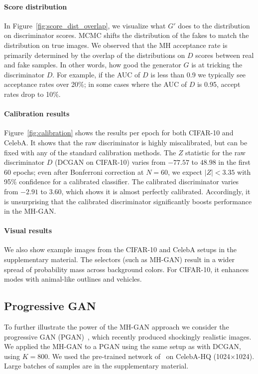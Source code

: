 \documentclass{article}
\begin{document}
\paragraph{Score distribution}
In Figure~\ref{fig:score_dist_overlap}, we visualize what $G'$ does to the distribution on discriminator scores.
MCMC shifts the distribution of the fakes to match the distribution on true images.
We observed that the MH acceptance rate is primarily determined by the overlap of the distributions on $D$ scores between real and fake samples.
In other words, how good the generator $G$ is at tricking the discriminator $D$.
For example, if the AUC of $D$ is less than 0.9 we typically see acceptance rates over 20\%; in some cases where the AUC of $D$ is 0.95, accept rates drop to 10\%.

\paragraph{Calibration results}
Figure~\ref{fig:calibration} shows the results per epoch for both CIFAR-10 and CelebA\@.
It shows that the raw discriminator is highly miscalibrated, but can be fixed with any of the standard calibration methods.
The $Z$ statistic for the raw discriminator $D$ (DCGAN on CIFAR-10) varies from $-77.57$ to $48.98$ in the first 60 epochs; even after Bonferroni correction at $N \!\!=\!\! 60$, we expect $|Z| < 3.35$ with 95\% confidence for a calibrated classifier.
The calibrated discriminator varies from $-2.91$ to $3.60$, which shows it is almost perfectly calibrated.
Accordingly, it is unsurprising that the calibrated discriminator significantly boosts performance in the MH-GAN\@.

\paragraph{Visual results}
We also show example images from the CIFAR-10 and CelebA setups in the supplementary material.
The selectors (such as MH-GAN) result in a wider spread of probability mass across background colors.
For CIFAR-10, it enhances modes with animal-like outlines and vehicles.

\subsection{Progressive GAN}

To further illustrate the power of the MH-GAN approach we consider the progressive GAN (PGAN)~\citep{Karras2017}, which recently produced shockingly realistic images.
We applied the MH-GAN to a PGAN using the same setup as with DCGAN, using $K=800$.
We used the pre-trained network of~\citet{Karras2017} on CelebA-HQ (1024$\times$1024)\@.
Large batches of samples are in the supplementary material.
\end{document}
